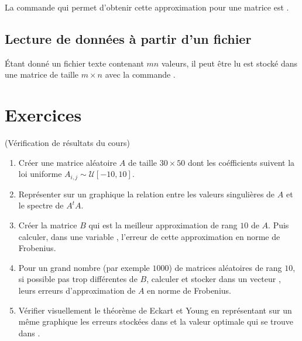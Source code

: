\documentclass[a4paper,12pt,reqno]{amsart}
\begin{document}
La commande  qui permet d'obtenir cette approximation pour une matrice  est .

\subsection*{Lecture de données à partir d'un fichier}

Étant donné un fichier texte  contenant $mn$ valeurs, il peut être lu est stocké dans une matrice  de taille $m \times n$ avec la commande .


\section{Exercices}

\begin{exo} (Vérification de résultats du cours)

  \begin{enumerate}
    \item Créer une matrice aléatoire $A$ de taille $30 \times 50$ dont les coéfficients suivent la loi uniforme $A_{i,j} \sim \mathcal{U}[-10,10]$.

    \item Représenter sur un graphique la relation entre les valeurs singulières de $A$ et le spectre de $A^{t}A$.

    \item Créer la matrice $B$ qui est la meilleur approximation de rang $10$ de $A$. Puis calculer, dans une variable , l'erreur de cette approximation en norme de Frobenius.

    \item Pour un grand nombre (par exemple $1000$) de matrices aléatoires de rang $10$, si possible pas trop différentes de $B$, calculer et stocker dans un vecteur , leurs erreurs d'approximation de $A$ en norme de Frobenius.

     \item Vérifier visuellement le théorème de Eckart et Young en représentant sur un même graphique les erreurs stockées dans  et la valeur optimale qui se trouve dans .

  \end{enumerate}

\end{exo}
\end{document}
